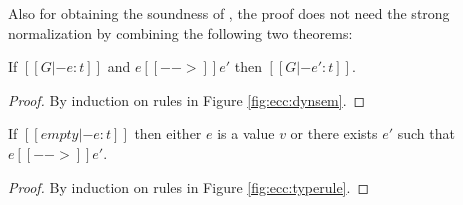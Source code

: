 Also for obtaining the soundness of \expcc, the proof does not need the strong normalization by combining the following two theorems:

\begin{thm}
  If $[[G |- e:t]]$ and $e [[-->]] e'$ then $[[G |- e':t]]$.
\end{thm}

\begin{proof}
	By induction on rules in Figure \ref{fig:ecc:dynsem}.
\end{proof}

\begin{thm}[Progress]
  If $[[empty |- e:t]]$ then either $e$ is a value $v$ or there exists
  $e'$ such that $e [[-->]] e'$.
\end{thm}

\begin{proof}
	By induction on rules in Figure \ref{fig:ecc:typerule}.
\end{proof}
